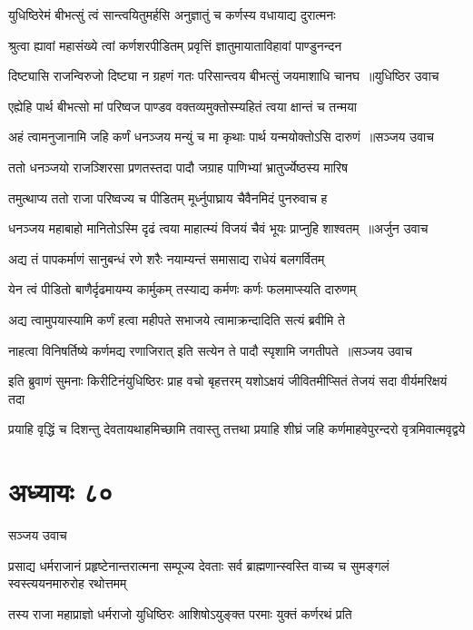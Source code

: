 \twolineshloka
{युधिष्ठिरेमं बीभत्सुं त्वं सान्त्वयितुमर्हसि}
{अनुज्ञातुं च कर्णस्य वधायाद्य दुरात्मनः}


\twolineshloka
{श्रुत्वा ह्यावां महासंख्ये त्वां कर्णशरपीडितम्}
{प्रवृत्तिं ज्ञातुमायाताविहावां पाण्डुनन्दन}


\threelineshloka
{दिष्ट्यासि राजन्विरुजो दिष्ट्या न ग्रहणं गतः}
{परिसान्त्वय बीभत्सुं जयमाशाधि चानघ ॥युधिष्ठिर उवाच}
{}


\twolineshloka
{एह्येहि पार्थ बीभत्सो मां परिष्वज पाण्डव}
{वक्तव्यमुक्तोस्म्यहितं त्वया क्षान्तं च तन्मया}


\threelineshloka
{अहं त्वामनुजानामि जहि कर्णं धनञ्जय}
{मन्युं च मा कृथाः पार्थ यन्मयोक्तोऽसि दारुणं ॥सञ्जय उवाच}
{}


\twolineshloka
{ततो धनञ्जयो राजञ्शिरसा प्रणतस्तदा}
{पादौ जग्राह पाणिभ्यां भ्रातुर्ज्येष्ठस्य मारिष}


\twolineshloka
{तमुत्थाप्य ततो राजा परिष्वज्य च पीडितम्}
{मूर्ध्नुपाघ्राय चैवैनमिदं पुनरुवाच ह}


\threelineshloka
{धनञ्जय महाबाहो मानितोऽस्मि दृढं त्वया}
{माहात्म्यं विजयं चैवं भूयः प्राप्नुहि शाश्वतम् ॥अर्जुन उवाच}
{}


\twolineshloka
{अद्य तं पापकर्माणं सानुबन्धं रणे शरैः}
{नयाम्यन्तं समासाद्य राधेयं बलगर्वितम्}


\twolineshloka
{येन त्वं पीडितो बाणैर्दृढमायम्य कार्मुकम्}
{तस्याद्य कर्मणः कर्णः फलमाप्स्यति दारुणम्}


\twolineshloka
{अद्य त्वामुपयास्यामि कर्णं हत्वा महीपते}
{सभाजये त्वामाक्रन्दादिति सत्यं ब्रवीमि ते}


\threelineshloka
{नाहत्वा विनिषर्तिष्ये कर्णमद्य रणाजिरात्}
{इति सत्येन ते पादौ स्पृशामि जगतीपते ॥सञ्जय उवाच}
{}


\twolineshloka
{इति ब्रुवाणं सुमनाः किरीटिनंयुधिष्ठिरः प्राह वचो बृहत्तरम्}
{यशोऽक्षयं जीवितमीप्सितं तेजयं सदा वीर्यमरिक्षयं तदा}


\twolineshloka
{प्रयाहि वृद्धिं च दिशन्तु देवतायथाहमिच्छामि तवास्तु तत्तथा}
{प्रयाहि शीघ्रं जहि कर्णमाहवेपुरन्दरो वृत्रमिवात्मवृद्वये}


\chapter{अध्यायः ८०}
\twolineshloka
{सञ्जय उवाच}
{}


\threelineshloka
{प्रसाद्य धर्मराजानं प्रहृष्टेनान्तरात्मना}
{सम्पूज्य देवताः सर्व ब्राह्मणान्स्वस्ति वाच्य च}
{सुमङ्गलं स्वस्त्ययनमारुरोह रथोत्तमम्}


\twolineshloka
{तस्य राजा महाप्राज्ञो धर्मराजो युधिष्ठिरः}
{आशिषोऽयुङ्क्त परमाः युक्तं कर्णरथं प्रति}


